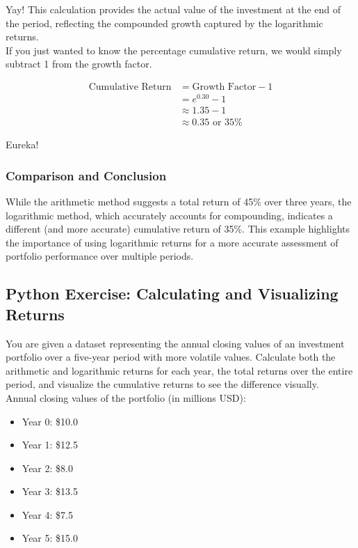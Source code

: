 \documentclass{article}
\begin{document}
Yay! This calculation provides the actual value of the investment at the end of the period, reflecting the compounded growth captured by the logarithmic returns. \\

If you just wanted to know the percentage cumulative return, we would simply subtract 1 from the growth factor.

\begin{align*}
    \text{Cumulative Return} &= \text{Growth Factor} - 1 \\
                             &= e^{0.30} - 1 \\
                             &\approx 1.35 - 1 \\
                             &\approx 0.35 \text{ or } 35\%
\end{align*}

Eureka!

\subsubsection{Comparison and Conclusion}

While the arithmetic method suggests a total return of 45\% over three years, the logarithmic method, which accurately accounts for compounding, indicates a different (and more accurate) cumulative return of 35\%. This example highlights the importance of using logarithmic returns for a more accurate assessment of portfolio performance over multiple periods.



\subsection{Python Exercise: Calculating and Visualizing Returns}

You are given a dataset representing the annual closing values of an investment portfolio over a five-year period with more volatile values. Calculate both the arithmetic and logarithmic returns for each year, the total returns over the entire period, and visualize the cumulative returns to see the difference visually. \\

Annual closing values of the portfolio (in millions USD):

\begin{itemize}
    \item Year 0: \$10.0
    \item Year 1: \$12.5
    \item Year 2: \$8.0
    \item Year 3: \$13.5
    \item Year 4: \$7.5
    \item Year 5: \$15.0
\end{itemize}
\end{document}
